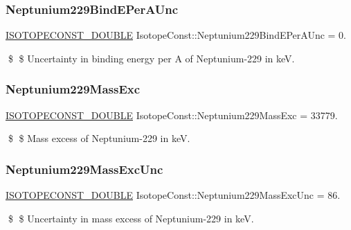 \subsubsection{\texorpdfstring{Neptunium229\+Bind\+E\+Per\+A\+Unc}{Neptunium229BindEPerAUnc}}
{\footnotesize\ttfamily \mbox{\hyperlink{group___isotope_const-_macros_ga8f45a7272ce02c0b4c65c44636ed719a}{I\+S\+O\+T\+O\+P\+E\+C\+O\+N\+S\+T\+\_\+\+D\+O\+U\+B\+LE}} Isotope\+Const\+::\+Neptunium229\+Bind\+E\+Per\+A\+Unc = 0.}

\$ \$ Uncertainty in binding energy per A of Neptunium-\/229 in keV. \mbox{\label{group___isotope_const-_neptunium-_np229_ga38305225c8f1def4037c778d39e4775f}} 
\subsubsection{\texorpdfstring{Neptunium229\+Mass\+Exc}{Neptunium229MassExc}}
{\footnotesize\ttfamily \mbox{\hyperlink{group___isotope_const-_macros_ga8f45a7272ce02c0b4c65c44636ed719a}{I\+S\+O\+T\+O\+P\+E\+C\+O\+N\+S\+T\+\_\+\+D\+O\+U\+B\+LE}} Isotope\+Const\+::\+Neptunium229\+Mass\+Exc = 33779.}

\$ \$ Mass excess of Neptunium-\/229 in keV. \mbox{\label{group___isotope_const-_neptunium-_np229_ga87610dbc97117c9c39e72777658258a0}} 
\subsubsection{\texorpdfstring{Neptunium229\+Mass\+Exc\+Unc}{Neptunium229MassExcUnc}}
{\footnotesize\ttfamily \mbox{\hyperlink{group___isotope_const-_macros_ga8f45a7272ce02c0b4c65c44636ed719a}{I\+S\+O\+T\+O\+P\+E\+C\+O\+N\+S\+T\+\_\+\+D\+O\+U\+B\+LE}} Isotope\+Const\+::\+Neptunium229\+Mass\+Exc\+Unc = 86.}

\$ \$ Uncertainty in mass excess of Neptunium-\/229 in keV. \mbox{\label{group___isotope_const-_neptunium-_np229_gac96710c75fa88bd1df528a0f51bd1440}} 
